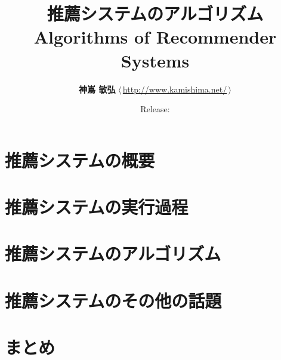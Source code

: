 \documentclass{jsbook}
\title{\Huge\sffamily\bfseries 推薦システムのアルゴリズム\\\medskip\Large Algorithms of Recommender Systems}
\author{\Large\textbf{神嶌 敏弘} \quad$\langle\,$\url{http://www.kamishima.net/}$\,\rangle$}
\date{Release: }
\begin{document}
\frontmatter

\maketitle

\onehalfspacing





\tableofcontents

\mainmatter


\part{推薦システムの概要}
\label{part:overview}




\part{推薦システムの実行過程}
\label{part:process}





\part{推薦システムのアルゴリズム}
\label{part:algorithm}







\part{推薦システムのその他の話題}
\label{part:topic}




\part{まとめ}
\label{part:conclusion}





\backmatter

\singlespacing
\small



\printindex
\end{document}
